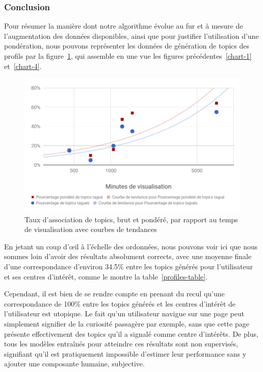 		\subsubsection{Conclusion}

			Pour résumer la manière dont notre algorithme évolue au fur et à mesure de l'augmentation des données disponibles, ainsi que pour justifier l'utilisation d'une pondération, nous pouvons représenter les données de génération de topics des profils par la figure~\ref{chart-5}, qui assemble en une vue les figures précédentes~\ref{chart-1} et~\ref{chart-4}.

			\begin{figure}[!h]
				\centering
				\includegraphics[height=0.65\textwidth]{images/results/chart-5}
				\caption{Taux d'association de topics, brut et pondéré, par rapport au temps de visualisation avec courbes de tendances}
				\label{chart-5}
			\end{figure}{}

			En jetant un coup d’œil à l'échelle des ordonnées, nous pouvons voir ici que nous sommes loin d'avoir des résultats absolument corrects, avec une moyenne finale d'une correspondance d'environ 34.5\% entre les topics générés pour l'utilisateur et ses centres d'intérêt, comme le montre la table~\ref{profiles-table}.

			Cependant, il est bien de se rendre compte en prenant du recul qu'une correspondance de 100\% entre les topics générés et les centres d'intérêt de l'utilisateur est utopique.
			Le fait qu'un utilisateur navigue sur une page peut simplement signifier de la curiosité passagère par exemple, sans que cette page présente effectivement des topics qu'il a signalé comme centre d'intérêts. De plus, tous les modèles entraînés pour atteindre ces résultats sont non supervisés, signifiant qu'il est pratiquement impossible d'estimer leur performance sans y ajouter une composante humaine, subjective.

